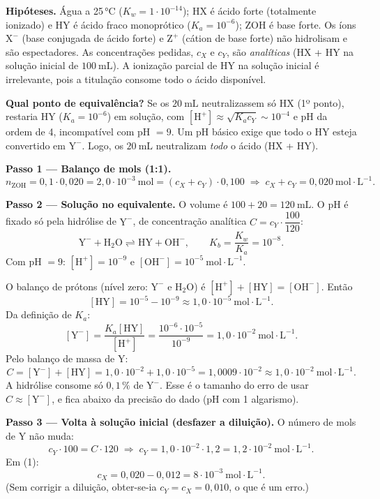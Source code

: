 \documentclass{article}%
\begin{document}
\textbf{Hipóteses.} Água a 25\,°C ($K_w = 1\cdot10^{-14}$); HX é ácido forte (totalmente ionizado) e HY é ácido fraco monoprótico ($K_a = 10^{-6}$); ZOH é base forte. Os íons $\mathrm{X^-}$ (base conjugada de ácido forte) e $\mathrm{Z^+}$ (cátion de base forte) não hidrolisam e são espectadores. As concentrações pedidas, $c_X$ e $c_Y$, são \emph{analíticas} (HX + HY na solução inicial de $100\ \mathrm{mL}$). A ionização parcial de HY na solução inicial é irrelevante, pois a titulação consome todo o ácido disponível.

\textbf{Qual ponto de equivalência?} Se os $20\ \mathrm{mL}$ neutralizassem só HX (1º ponto), restaria HY ($K_a=10^{-6}$) em solução, com $[\mathrm{H^+}]\approx\sqrt{K_a c_Y}\sim10^{-4}$ e pH da ordem de 4, incompatível com pH $=9$. Um pH básico exige que todo o HY esteja convertido em $\mathrm{Y^-}$. Logo, os $20\ \mathrm{mL}$ neutralizam \emph{todo} o ácido (HX + HY).

\textbf{Passo 1 --- Balanço de mols (1:1).}
\[
n_{\mathrm{ZOH}} = 0{,}1\cdot0{,}020 = 2{,}0\cdot10^{-3}\ \mathrm{mol} = (c_X+c_Y)\cdot 0{,}100
\;\Rightarrow\; c_X + c_Y = 0{,}020\ \mathrm{mol\cdot L^{-1}}. \tag{1}
\]

\textbf{Passo 2 --- Solução no equivalente.} O volume é $100+20=120\ \mathrm{mL}$. O pH é fixado só pela hidrólise de $\mathrm{Y^-}$, de concentração analítica $C = c_Y\cdot\dfrac{100}{120}$:
\[
\mathrm{Y^- + H_2O \rightleftharpoons HY + OH^-},\qquad K_b=\frac{K_w}{K_a}=10^{-8}.
\]
Com pH $=9$: $[\mathrm{H^+}]=10^{-9}$ e $[\mathrm{OH^-}]=10^{-5}\ \mathrm{mol\cdot L^{-1}}$.

O balanço de prótons (nível zero: $\mathrm{Y^-}$ e $\mathrm{H_2O}$) é $[\mathrm{H^+}]+[\mathrm{HY}]=[\mathrm{OH^-}]$. Então
\[
[\mathrm{HY}] = 10^{-5}-10^{-9} \approx 1{,}0\cdot10^{-5}\ \mathrm{mol\cdot L^{-1}}.
\]
Da definição de $K_a$:
\[
[\mathrm{Y^-}]=\frac{K_a[\mathrm{HY}]}{[\mathrm{H^+}]}=\frac{10^{-6}\cdot10^{-5}}{10^{-9}}=1{,}0\cdot10^{-2}\ \mathrm{mol\cdot L^{-1}}.
\]
Pelo balanço de massa de Y:
\[
C=[\mathrm{Y^-}]+[\mathrm{HY}]=1{,}0\cdot10^{-2}+1{,}0\cdot10^{-5}=1{,}0009\cdot10^{-2}\approx1{,}0\cdot10^{-2}\ \mathrm{mol\cdot L^{-1}}.
\]
A hidrólise consome só $0{,}1\,\%$ de $\mathrm{Y^-}$. Esse é o tamanho do erro de usar $C\approx[\mathrm{Y^-}]$, e fica abaixo da precisão do dado (pH com 1 algarismo).

\textbf{Passo 3 --- Volta à solução inicial (desfazer a diluição).} O número de mols de Y não muda:
\[
c_Y\cdot100 = C\cdot120 \;\Rightarrow\; c_Y = 1{,}0\cdot10^{-2}\cdot1{,}2 = 1{,}2\cdot10^{-2}\ \mathrm{mol\cdot L^{-1}}.
\]
Em (1):
\[
c_X = 0{,}020-0{,}012 = 8\cdot10^{-3}\ \mathrm{mol\cdot L^{-1}}.
\]
(Sem corrigir a diluição, obter-se-ia $c_Y=c_X=0{,}010$, o que é um erro.)
\end{document}
